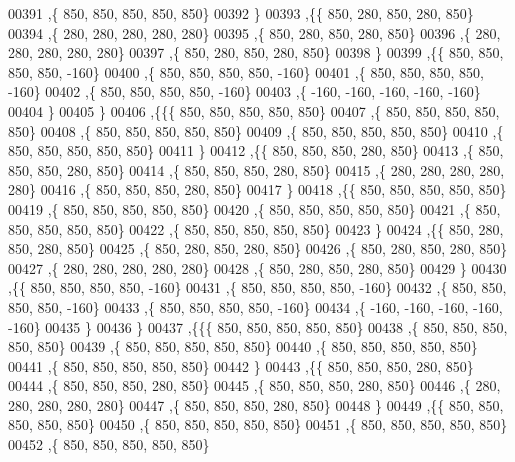 \begin{DoxyCode}
00391    ,\{   850,   850,   850,   850,   850\}
00392    \}
00393   ,\{\{   850,   280,   850,   280,   850\}
00394    ,\{   280,   280,   280,   280,   280\}
00395    ,\{   850,   280,   850,   280,   850\}
00396    ,\{   280,   280,   280,   280,   280\}
00397    ,\{   850,   280,   850,   280,   850\}
00398    \}
00399   ,\{\{   850,   850,   850,   850,  -160\}
00400    ,\{   850,   850,   850,   850,  -160\}
00401    ,\{   850,   850,   850,   850,  -160\}
00402    ,\{   850,   850,   850,   850,  -160\}
00403    ,\{  -160,  -160,  -160,  -160,  -160\}
00404    \}
00405   \}
00406  ,\{\{\{   850,   850,   850,   850,   850\}
00407    ,\{   850,   850,   850,   850,   850\}
00408    ,\{   850,   850,   850,   850,   850\}
00409    ,\{   850,   850,   850,   850,   850\}
00410    ,\{   850,   850,   850,   850,   850\}
00411    \}
00412   ,\{\{   850,   850,   850,   280,   850\}
00413    ,\{   850,   850,   850,   280,   850\}
00414    ,\{   850,   850,   850,   280,   850\}
00415    ,\{   280,   280,   280,   280,   280\}
00416    ,\{   850,   850,   850,   280,   850\}
00417    \}
00418   ,\{\{   850,   850,   850,   850,   850\}
00419    ,\{   850,   850,   850,   850,   850\}
00420    ,\{   850,   850,   850,   850,   850\}
00421    ,\{   850,   850,   850,   850,   850\}
00422    ,\{   850,   850,   850,   850,   850\}
00423    \}
00424   ,\{\{   850,   280,   850,   280,   850\}
00425    ,\{   850,   280,   850,   280,   850\}
00426    ,\{   850,   280,   850,   280,   850\}
00427    ,\{   280,   280,   280,   280,   280\}
00428    ,\{   850,   280,   850,   280,   850\}
00429    \}
00430   ,\{\{   850,   850,   850,   850,  -160\}
00431    ,\{   850,   850,   850,   850,  -160\}
00432    ,\{   850,   850,   850,   850,  -160\}
00433    ,\{   850,   850,   850,   850,  -160\}
00434    ,\{  -160,  -160,  -160,  -160,  -160\}
00435    \}
00436   \}
00437  ,\{\{\{   850,   850,   850,   850,   850\}
00438    ,\{   850,   850,   850,   850,   850\}
00439    ,\{   850,   850,   850,   850,   850\}
00440    ,\{   850,   850,   850,   850,   850\}
00441    ,\{   850,   850,   850,   850,   850\}
00442    \}
00443   ,\{\{   850,   850,   850,   280,   850\}
00444    ,\{   850,   850,   850,   280,   850\}
00445    ,\{   850,   850,   850,   280,   850\}
00446    ,\{   280,   280,   280,   280,   280\}
00447    ,\{   850,   850,   850,   280,   850\}
00448    \}
00449   ,\{\{   850,   850,   850,   850,   850\}
00450    ,\{   850,   850,   850,   850,   850\}
00451    ,\{   850,   850,   850,   850,   850\}
00452    ,\{   850,   850,   850,   850,   850\}

\end{DoxyCode}
